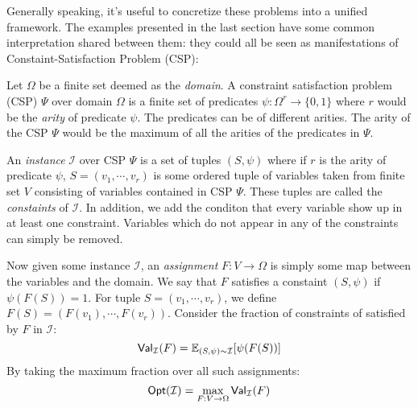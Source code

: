  Generally speaking, it's useful to concretize these problems into a unified framework. The examples presented in the last section have some common interpretation shared between them: they could all be seen as manifestations of Constaint-Satisfaction Problem (CSP):
%
\begin{definition}
  Let $\Omega$ be a finite set deemed as the \emph{domain}. A constraint satisfaction problem (CSP) $\Psi$ over domain $\Omega$ is a finite set of predicates $\psi:\Omega^r \rightarrow \{0,1\}$ where $r$ would be the \emph{arity} of predicate $\psi$. The predicates can be of different arities. The arity of the CSP $\Psi$ would be the maximum of all the arities of the predicates in $\Psi$. \newline

  \noindent An \emph{instance} $\mathcal{I}$ over CSP $\Psi$ is a set of tuples $(S,\psi)$ where if $r$ is the arity of predicate $\psi$, $S = (v_1,\cdots,v_r)$ is some ordered tuple of variables taken from finite set $V$ consisting of variables contained in CSP $\Psi$. These tuples are called the \emph{constaints} of $\mathcal{I}$. In addition, we add the conditon that every variable show up in at least one constraint. Variables which do not appear in any of the constraints can simply be removed. \newline

  \noindent Now given some instance $\mathcal{I}$, an \emph{assignment} $F:V \rightarrow \Omega$ is simply some  map between the variables and the domain. We say that $F$ satisfies a constaint $(S,\psi)$ if $\psi(F(S)) = 1$. For tuple $S = (v_1, \cdots, v_r)$, we define $F(S) = (F(v_1), \cdots, F(v_r))$. Consider the fraction of constraints of satisfied by $F$ in $\mathcal{I}$:
  \begin{equation}
  \mathsf{Val}_{\mathcal{I}}(F) = \mathbb{E}_{(S, \psi) \sim \mathcal{I}}[\psi(F(S))]
  \end{equation}
  By taking the maximum fraction over all such assignments:
  \begin{equation}
  \mathsf{Opt}(\mathcal{I}) = \max_{F: V \rightarrow \Omega} \mathsf{Val}_{\mathcal{I}}(F)
  \end{equation}
\end{definition}

